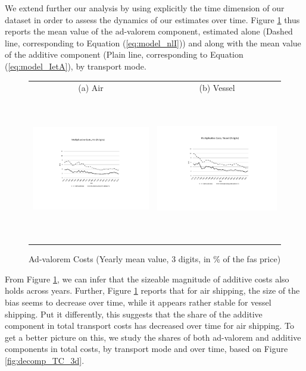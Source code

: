 \documentclass[a4paper,11pt]{article}
\begin{document}
We extend further our analysis by using explicitly the time dimension of our dataset in order to assess the dynamics of our estimates over time. Figure \ref{fig:mult_alone_withadd} thus reports the mean value of the ad-valorem component, estimated alone (Dashed line, corresponding to Equation (\ref{eq:model_nlI})) and along with the mean value of the additive component (Plain line, corresponding to Equation (\ref{eq:model_IetA}), by transport mode.

\begin{figure}[htbp]
\caption{Ad-valorem Costs (Yearly mean value, 3 digits, in \% of the fas price)}
\label{fig:mult_alone_withadd}
\begin{center}
\begin{tabular}{cc}
{\small (a) Air } & {\small (b) Vessel}\\
\includegraphics[width=3in, height=2.5in]{Fig1a_mult_air_3d.pdf}
& \includegraphics[width=3in,height=2.5in]{Fig1b_mult_vessel_3d.pdf} \\
\end{tabular}
\end{center}
\end{figure}

From Figure \ref{fig:mult_alone_withadd}, we can infer that the sizeable magnitude of additive costs also holds across years. Further, Figure \ref{fig:mult_alone_withadd} reports that for air shipping, the size of the bias seems to decrease over time, while it appears rather stable for vessel shipping. Put it differently, this suggests that the share of the additive component in total transport costs has decreased over time for air shipping. To get a better picture on this, we study the shares of both ad-valorem and additive components in total costs, by transport mode and over time, based on Figure \ref{fig:decomp_TC_3d}.
\end{document}
